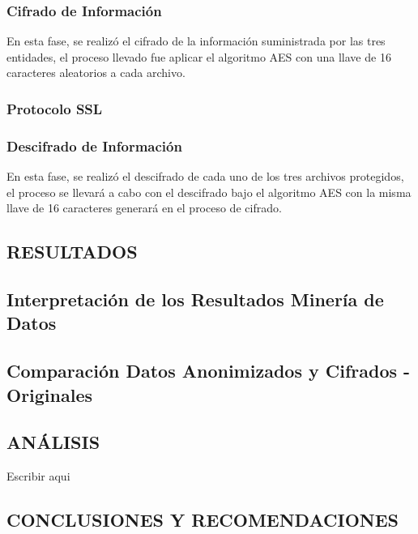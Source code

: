 \documentclass[a4paper,openright,12pt]{book}
\theoremstyle{definition}
\theoremstyle{remark}
\begin{document}
    	\subsection{Cifrado de Información}
        En esta fase, se realizó el cifrado de la información suministrada por las tres entidades,  el proceso llevado fue aplicar el algoritmo AES con una llave de 16 caracteres aleatorios a cada archivo.  
        
        \subsection{Protocolo SSL}
        
        \subsection{Descifrado de Información}
        En esta fase, se realizó el descifrado de cada uno de los tres archivos protegidos, el proceso se llevará a cabo con el descifrado bajo el algoritmo AES con la misma llave de 16 caracteres generará en el proceso de cifrado.

\clearpage

\begin{center}
 \chapter{RESULTADOS}\label{cap.resultados}
\end{center}
\section{Interpretación de los Resultados Minería de Datos}
\section{Comparación Datos Anonimizados y Cifrados - Originales}
\clearpage

\begin{center}
 \chapter{ANÁLISIS}\label{cap.analisis}
\end{center}
Escribir aqui
\clearpage

\begin{center}
 \chapter{CONCLUSIONES Y RECOMENDACIONES}\label{cap.conclusiones}
\end{center}
\end{document}

